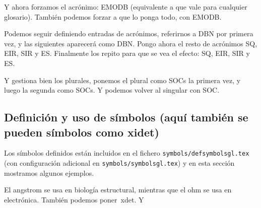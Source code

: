 \glsresetall[acronym]

Y ahora forzamos el acrónimo: \acs{EMODB} (equivalente a
 que vale para cualquier glosario). También podemos
forzar a que lo ponga todo, con \acf{EMODB}.


Podemos seguir definiendo entradas de acrónimos, referirnos a \ac{DBN}
por primera vez, y las siguientes aparecerá como \ac{DBN}.  Pongo ahora
el resto de acrónimos \ac{SQ}, \ac{EIR}, \ac{SIR} y
\ac{ES}. Finalmente los repito para que se vea el efecto: \ac{SQ},
\ac{EIR}, \ac{SIR} y \ac{ES}.

Y gestiona bien los plurales, ponemos el plural como \acp{SOC} la
primera vez, y luego la segunda como \acp{SOC}. Y podemos volver al
singular con \ac{SOC}.


\subsection{Definición y uso de símbolos (aquí también
  se pueden símbolos como \ac{xidet})}
\label{sec:simbolos}

Los símbolos definidos están incluidos en el fichero
\texttt{symbols/defsymbolsgl.tex} (con configuración adicional en
\texttt{symbols/symbolsgl.tex}) y en esta sección mostramos algunos
ejemplos.

El \ac{angstrom} se usa en biología estructural, mientras que el
\ac{ohm} se usa en electrónica. También podemos poner~\ac{xdet}. Y
